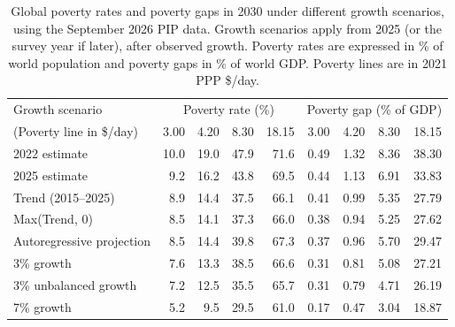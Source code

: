 \begin{table}[h]

\caption[Global poverty (rates and gaps) in 2030 under different growth scenarios (September 2026 PIP data).]{\label{tab:poverty_update}Global poverty rates and poverty gaps in 2030 under different growth scenarios, using the September 2026 PIP data. Growth scenarios apply from 2025 (or the survey year if later), after observed growth. Poverty rates are expressed in \% of world population and poverty gaps in \% of world GDP. Poverty lines are in 2021 PPP \$/day.}
\centering
\begin{tabular}[t]{lrrrrrrrr}
\toprule Growth scenario & \multicolumn{4}{c}{Poverty rate (\%)} & \multicolumn{4}{c}{Poverty gap (\% of GDP)} \\ 
 (Poverty line in \$/day)  & 3.00 & 4.20 & 8.30 & 18.15 & 3.00 & 4.20 & 8.30 & 18.15\\
\midrule
2022 estimate & 10.0 & 19.0 & 47.9 & 71.6 & 0.49 & 1.32 & 8.36 & 38.30\\
2025 estimate & 9.2 & 16.2 & 43.8 & 69.5 & 0.44 & 1.13 & 6.91 & 33.83\\
Trend (2015--2025) & 8.9 & 14.4 & 37.5 & 66.1 & 0.41 & 0.99 & 5.35 & 27.79\\
Max(Trend, 0) & 8.5 & 14.1 & 37.3 & 66.0 & 0.38 & 0.94 & 5.25 & 27.62\\
Autoregressive projection & 8.5 & 14.4 & 39.8 & 67.3 & 0.37 & 0.96 & 5.70 & 29.47\\
3\% growth & 7.6 & 13.3 & 38.5 & 66.6 & 0.31 & 0.81 & 5.08 & 27.21\\
3\% unbalanced growth & 7.2 & 12.5 & 35.5 & 65.7 & 0.31 & 0.79 & 4.71 & 26.19\\
7\% growth & 5.2 & 9.5 & 29.5 & 61.0 & 0.17 & 0.47 & 3.04 & 18.87\\
\bottomrule
\end{tabular}
\end{table}
